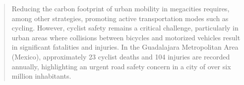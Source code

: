 \documentclass[preprint,12pt]{elsarticle}
\begin{document}
\begin{frontmatter}
\author[3]{Carlos Mex-Perera}
\author[1]{Juan-Carlos L\'opez-Pimentel}

\author[4]{Abraham Rodr\'iguez Mota}

\begin{abstract}
Reducing the carbon footprint of urban mobility in megacities requires, among other strategies, promoting active transportation modes such as cycling. However, cyclist safety remains a critical challenge, particularly in urban areas where collisions between bicycles and motorized vehicles result in significant fatalities and injuries. In the Guadalajara Metropolitan Area (Mexico), approximately 23 cyclist deaths and 104 injuries are recorded annually, highlighting an urgent road safety concern in a city of over six million inhabitants.


\end{abstract}
\end{frontmatter}
\end{document}
